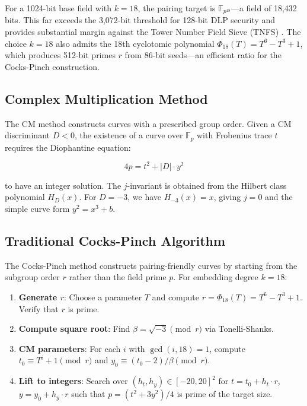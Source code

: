 For a 1024-bit base field with \(k = 18\), the pairing target is
\(\mathbb{F}_{p^{18}}\)---a field of 18,432 bits. This far exceeds the
3,072-bit threshold for 128-bit DLP security and provides substantial
margin against the Tower Number Field Sieve (TNFS)
\cite{BarbulescuDuquesne2019, KimBarbulescu2016}. The choice \(k = 18\)
also admits the 18th cyclotomic polynomial
\(\Phi_{18}(T) = T^6 - T^3 + 1\), which produces 512-bit primes \(r\)
from 86-bit seeds---an efficient ratio for the Cocks-Pinch construction.

\subsection{Complex Multiplication
Method}\label{complex-multiplication-method}

The CM method constructs curves with a prescribed group order. Given a
CM discriminant \(D < 0\), the existence of a curve over
\(\mathbb{F}_p\) with Frobenius trace \(t\) requires the Diophantine
equation:

\[4p = t^2 + |D| \cdot y^2\]

to have an integer solution. The \(j\)-invariant is obtained from the
Hilbert class polynomial \(H_D(x)\). For \(D = -3\), we have
\(H_{-3}(x) = x\), giving \(j = 0\) and the simple curve form
\(y^2 = x^3 + b\).

\subsection{Traditional Cocks-Pinch
Algorithm}\label{traditional-cocks-pinch-algorithm}

The Cocks-Pinch method \cite{CocksPinch2001} constructs
pairing-friendly curves by starting from the subgroup order \(r\) rather
than the field prime \(p\). For embedding degree \(k = 18\):

\begin{enumerate}
\def\labelenumi{\arabic{enumi}.}
\tightlist
\item
  \textbf{Generate \(r\)}: Choose a parameter \(T\) and compute
  \(r = \Phi_{18}(T) = T^6 - T^3 + 1\). Verify that \(r\) is prime.
\item
  \textbf{Compute square root}: Find \(\beta = \sqrt{-3} \pmod{r}\) via
  Tonelli-Shanks.
\item
  \textbf{CM parameters}: For each \(i\) with \(\gcd(i, 18) = 1\),
  compute \(t_0 \equiv T^i + 1 \pmod{r}\) and
  \(y_0 \equiv (t_0 - 2)/\beta \pmod{r}\).
\item
  \textbf{Lift to integers}: Search over \((h_t, h_y) \in [-20, 20]^2\)
  for \(t = t_0 + h_t \cdot r\), \(y = y_0 + h_y \cdot r\) such that
  \(p = (t^2 + 3y^2)/4\) is prime of the target size.
\end{enumerate}

